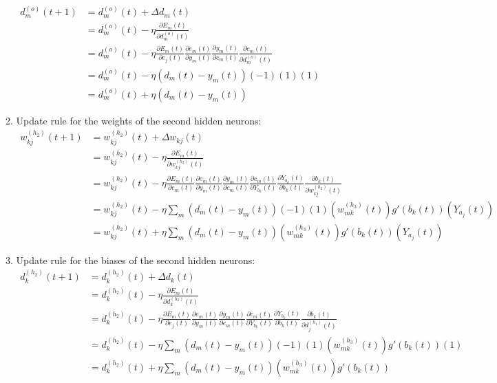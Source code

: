 \documentclass[12pt,a4paper]{article}
\begin{document}
\begin{CJK}{UTF8}{bsmi}
\begin{enumerate}
\begin{enumerate}
\\
$
\begin{aligned}
d_{m}^{(o)}(t+1) & =d_{m}^{(o)}(t)+\Delta d_{m}(t)
\\[0.5cm]
& =d_{m}^{(o)}(t)-\eta\frac{\partial E_m(t)}{\partial d_{m}^{(o)}(t)}
\\[0.5cm]
& =d_{m}^{(o)}(t)-\eta\frac{\partial E_m(t)}{\partial e_{j}(t)}
\frac{\partial e_{m}(t)}{\partial y_m(t)}
\frac{\partial y_m(t)}{\partial c_{m}(t)}
\frac{\partial c_m(t)}{\partial d_{m}^{(o)}(t)}
\\[0.5cm]
& =d_{m}^{(o)}(t)-\eta(d_m(t)-y_m(t))(-1)(1)(1)
\\[0.5cm]
& =d_{m}^{(o)}(t)+\eta(d_m(t)-y_m(t))
\end{aligned}
$
\newpage

	\item Update rule for the weights of the second hidden neurons:
\vspace{0.5cm}
\\
$
\begin{aligned}
w_{kj}^{(h_2)}(t+1) & =w_{kj}^{(h_2)}(t)+\Delta w_{kj}(t)
\\[0.5cm]
& =	w_{kj}^{(h_2)}(t)-\eta\frac{\partial E_m(t)}{\partial w_{kj}^{(h_2)}(t)}
\\[0.5cm]
& = w_{kj}^{(h_2)}(t)-\eta\frac{\partial E_m(t)}{\partial e_{m}(t)}
\frac{\partial e_{m}(t)}{\partial y_m(t)}
\frac{\partial y_m(t)}{\partial c_{m}(t)}
\frac{\partial c_m(t)}{\partial Y_{b_k}(t)}
\frac{\partial Y_{b_k}(t)}{\partial b_k(t)}
\frac{\partial b_k(t)}{\partial w_{kj}^{(h_2)}(t)}
\\[0.5cm]
& = w_{kj}^{(h_2)}(t)-\eta\sum_m(d_m(t)-y_m(t))(-1)(1)(w_{mk}^{(h_3)}(t))g'(b_k(t))(Y_{a_j}(t))
\\[0.5cm]
& = w_{kj}^{(h_2)}(t)+\eta\sum_m(d_m(t)-y_m(t))(w_{mk}^{(h_3)}(t))g'(b_k(t))(Y_{a_j}(t))
\end{aligned}
$

	\item Update rule for the biases of the second hidden neurons:
\vspace{0.5cm}
\\
$
\begin{aligned}
d_{k}^{(h_2)}(t+1) & =d_{k}^{(h_2)}(t)+\Delta d_{k}(t)
\\[0.5cm]
& =d_{k}^{(h_2)}(t)-\eta\frac{\partial E_m(t)}{\partial d_{k}^{(h_2)}(t)}
\\[0.5cm]
& =d_{k}^{(h_2)}(t)-\eta\frac{\partial E_m(t)}{\partial e_{j}(t)}
\frac{\partial e_{m}(t)}{\partial y_m(t)}
\frac{\partial y_m(t)}{\partial c_{m}(t)}
\frac{\partial c_m(t)}{\partial Y_{b_k}(t)}
\frac{\partial Y_{b_k}(t)}{\partial b_k(t)}
\frac{\partial b_k(t)}{\partial d_j^{(h_1)}(t)}
\\[0.5cm]
& =d_{k}^{(h_2)}(t)-\eta\sum_m(d_m(t)-y_m(t))(-1)(1)(w_{mk}^{(h_3)}(t))g'(b_k(t))(1)
\\[0.5cm]
& =d_{k}^{(h_2)}(t)+\eta\sum_m(d_m(t)-y_m(t))(w_{mk}^{(h_3)}(t))g'(b_k(t))
\end{aligned}
$
\newpage



\end{enumerate}
\end{enumerate}
\end{CJK}
\end{document}
